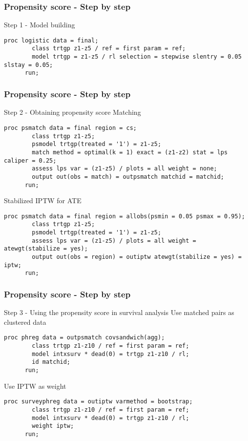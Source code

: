 \documentclass[11pt, aspectratio = 169]{beamer}
\begin{document}
\begin{frame}[fragile]
  \frametitle{Propensity score - Step by step}
  \begin{block}{Step 1 - Model building}
    \begin{lstlisting}[gobble = 6]
      proc logistic data = final;
        class trtgp z1-z5 / ref = first param = ref;
        model trtgp = z1-z5 / rl selection = stepwise slentry = 0.05 slstay = 0.05;
      run;
    \end{lstlisting}
  \end{block}
\end{frame}

\begin{frame}[fragile]
  \frametitle{Propensity score - Step by step}
  \begin{block}{Step 2 - Obtaining propensity score}
    Matching
    \begin{lstlisting}[gobble = 6]
      proc psmatch data = final region = cs;
        class trtgp z1-z5;
        psmodel trtgp(treated = '1') = z1-z5;
        match method = optimal(k = 1) exact = (z1-z2) stat = lps caliper = 0.25;
        assess lps var = (z1-z5) / plots = all weight = none;
        output out(obs = match) = outpsmatch matchid = matchid;
      run;
    \end{lstlisting}
    Stabilized IPTW for ATE
    \begin{lstlisting}[gobble = 6]
      proc psmatch data = final region = allobs(psmin = 0.05 psmax = 0.95);
        class trtgp z1-z5;
        psmodel trtgp(treated = '1') = z1-z5;
        assess lps var = (z1-z5) / plots = all weight = atewgt(stabilize = yes);
        output out(obs = region) = outiptw atewgt(stabilize = yes) = iptw;
      run;
    \end{lstlisting}
  \end{block}
\end{frame}

\begin{frame}[fragile]
  \frametitle{Propensity score - Step by step}
  \begin{block}{Step 3 - Using the propensity score in survival analysis}
    Use matched pairs as clustered data
    \begin{lstlisting}[gobble = 6]
      proc phreg data = outpsmatch covsandwich(agg);
        class trtgp z1-z10 / ref = first param = ref;
        model intxsurv * dead(0) = trtgp z1-z10 / rl;
        id matchid;
      run;
    \end{lstlisting}
    Use IPTW as weight
    \begin{lstlisting}[gobble = 6]
      proc surveyphreg data = outiptw varmethod = bootstrap;
        class trtgp z1-z10 / ref = first param = ref;
        model intxsurv * dead(0) = trtgp z1-z10 / rl;
        weight iptw;
      run;
    \end{lstlisting}
  \end{block}
\end{frame}
\end{document}
